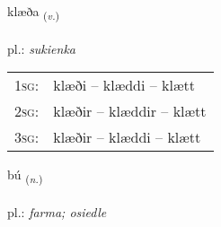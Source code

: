 \documentclass[frontgrid, backgrid]{flacards}\usepackage[]{graphicx}\usepackage[]{xcolor}
\begin{document}
\renewcommand{\flhead}{\vskip5pt \fboxsep=0pt {\small\bfseries\footnotesize Sagnorð | Verb}}
\renewcommand{\fcfoot}{\vskip5pt \fboxsep=0pt \hspace{2pt}{\small\bfseries\footnotesize 2K}}

\renewcommand{\blhead}{\vskip5pt {\small\bfseries\footnotesize Sagnorð | Verb }}
\renewcommand{\bcfoot}{\vskip5pt \hspace{2pt}{\small\bfseries\footnotesize 2K}}


{klæða \small{\textsubscript{(\textit{v.})}} \\[1ex] %
\textphonetic{[kʰlaiːða]} \\
pl.: \emph{sukienka} \\  [2ex]
\renewcommand*{\arraystretch}{0.8}
\begin{tabular}{p{1cm}l}
\textsc{1sg}: & klæði -- klæddi -- klætt \\ 
\textsc{2sg}: & klæðir -- klæddir -- klætt \\ 
\textsc{3sg}: & klæðir -- klæddi -- klætt \\ 
\end{tabular}
}

\renewcommand{\flhead}{\vskip5pt \fboxsep=0pt {\small\bfseries\footnotesize Nafnorð | Noun}}
\renewcommand{\fcfoot}{\vskip5pt \fboxsep=0pt \hspace{2pt}{\small\bfseries\footnotesize 2K}}

\renewcommand{\blhead}{\vskip5pt {\small\bfseries\footnotesize Nafnorð | Noun }}
\renewcommand{\bcfoot}{\vskip5pt \hspace{2pt}{\small\bfseries\footnotesize 2K}}


{bú \small{\textsubscript{(\textit{n.})}} \\[1ex] %
\textphonetic{[puː]} \\
pl.: \emph{farma; osiedle} \\  [2ex]
\renewcommand*{\arraystretch}{0.8}
}
\end{document}
